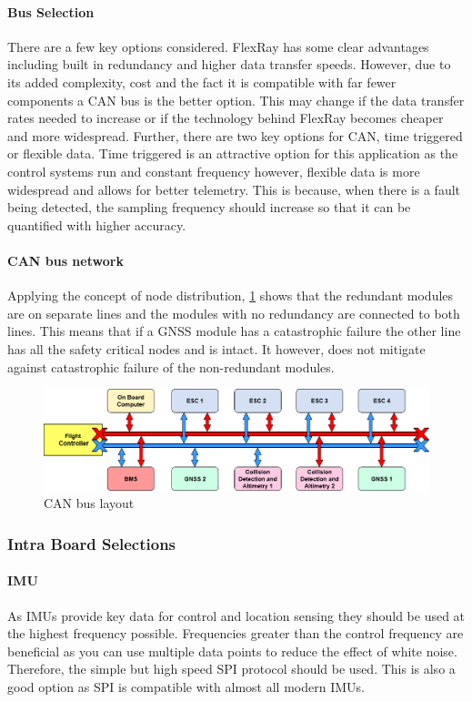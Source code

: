 \paragraph{Bus Selection}
There are a few key options considered. FlexRay has some clear advantages including built in redundancy and higher data transfer speeds. However, due to its added complexity, cost and the fact it is compatible with far fewer components a \gls{CAN} bus is the better option. This may change if the data transfer rates needed to increase or if the technology behind FlexRay becomes cheaper and more widespread. Further, there are two key options for \gls{CAN}, time triggered or flexible data. Time triggered is an attractive option for this application as the control systems run and constant frequency however, flexible data is more widespread and allows for better telemetry. This is because, when there is a fault being detected, the sampling frequency should increase so that it can be quantified with higher accuracy.
\paragraph{CAN bus network}
Applying the concept of node distribution, \ref{fig:CAN_bus} shows that the redundant modules are on separate lines and the modules with no redundancy are connected to both lines. This means that if a \gls{GNSS} module has a catastrophic failure the other line has all the safety critical nodes and is intact. It however, does not mitigate against catastrophic failure of the non-redundant modules.
 \begin{figure}[h!]
 \centering
  \includegraphics[width=1\textwidth]{figs/Thomas/Intra Communication/CAN bus.png}
 \caption{CAN bus layout}
 \label{fig:CAN_bus}
 \end{figure}
 


\subsubsection{Intra Board Selections}
\paragraph{\gls{IMU}}
As \gls{IMU}s provide key data for control and location sensing they should be used at the highest frequency possible. Frequencies greater than the control frequency are beneficial as you can use multiple data points to reduce the effect of white noise. Therefore, the simple but high speed \gls{SPI} protocol should be used. This is also a good option as \gls{SPI} is compatible with almost all modern \gls{IMU}s.

